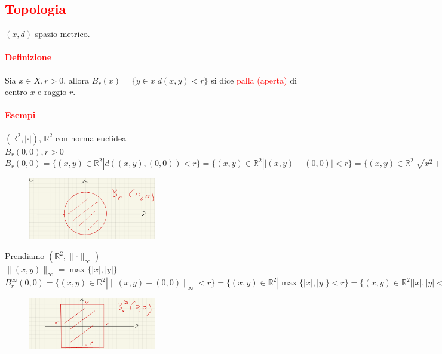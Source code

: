 \documentclass{article}
\newcommand{\R}{\mathbb{R}}
\begin{document}
\subsection{\textcolor{red}{Topologia}}
$(x,d)$ spazio metrico.

\paragraph{\textcolor{red}{Definizione}}
Sia $x\in X, r >0$, allora $B_r(x)=\{ y\in x|d(x,y) < r \}$ si dice \textcolor{red}{palla (aperta)} di centro $x$ e raggio $r$.

\paragraph{\textcolor{red}{Esempi}}
$(\R^2,|\cdot|)$, $\R^2$ con norma euclidea\\
$B_r(0,0), r>0$\\
$B_r(0,0)=\{ (x,y)\in \R^2 |d((x,y),(0,0))<r \}=\{ (x,y)\in \R^2 | |(x,y)-(0,0)| <r \}=\{ (x,y)\in \R^2 | \sqrt{x^2+y^2} <r\}$
\begin{figure}[h!]
    \centering
    \includegraphics[width=0.5\textwidth]{Screenshot from 2023-03-22 17-44-33.png}
\end{figure}

Prendiamo $(\R^2,\parallel\cdot\parallel_\infty)$\\
$\parallel(x,y)\parallel_\infty= \max\{|x|,|y|\}$\\
$B_r^\infty (0,0)=\{ (x,y)\in \R^2| \parallel(x,y)-(0,0) \parallel_\infty <r\}=\{ (x,y)\in \R^2| \max\{|x|,|y|\}<r\}= \{ (x,y)\in \R^2| |x|,|y| <r\}$
\begin{figure}[h!]
    \centering
    \includegraphics[width=0.5\textwidth]{Screenshot from 2023-03-22 17-45-00.png}
\end{figure}
\end{document}
